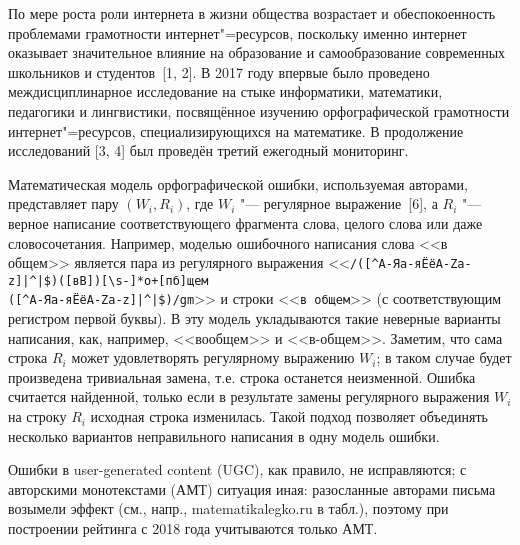 \vzmscaption

По мере роста роли интернета в жизни общества возрастает и обеспокоенность проблемами грамотности
интернет"=ресурсов, поскольку именно интернет оказывает значительное влияние на образование и самообразование современных школьников и
студентов~[1, 2].
В 2017 году впервые было проведено междисциплинарное исследование на стыке информатики, математики, педагогики и
лингвистики, посвящённое изучению орфографической грамотности интернет"=ресурсов, специализирующихся на математике.
В продолжение исследований [3, 4] был проведён третий ежегодный мониторинг.

Математическая модель орфографической ошибки, используемая авторами, представляет пару $(W_i, R_i)$,
где $W_i$ "--- регулярное выражение~[6], а $R_i$ "--- верное написание соответствующего фрагмента слова,
целого слова или даже словосочетания.
Например, моделью ошибочного написания слова <<в общем>> является пара из регулярного выражения
\linebreak
<<\verb"/([^А-Яа-яЁёA-Za-z­]|^|$)([вВ])[\s-]*о+[пб]щем" \\ \verb"([^А-Яа-яЁёA-Za-z­]|^|$)/gm">> и строки
<<\verb"в общем">> (с соответствующим регистром первой буквы).
В эту модель укладываются такие неверные варианты написания, как, например, <<вообщем>> и <<в-общем>>.
Заметим, что сама строка $R_i$ может удовлетворять регулярному выражению $W_i$;
в таком случае будет произведена тривиальная замена, т.е. строка останется неизменной.
Ошибка считается найденной, только если в результате замены регулярного выражения $W_i$ на строку $R_i$ исходная строка изменилась.
Такой подход позволяет объединять несколько вариантов неправильного написания в одну модель ошибки.


Ошибки в user-generated content (UGC), как правило, не исправляются;
с авторскими монотекстами (АМТ) ситуация иная:
разосланные авторами письма возымели эффект
(см., напр., matematikalegko.ru в табл.),
поэтому при построении рейтинга с 2018 года учитываются только АМТ.

